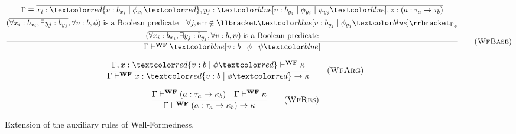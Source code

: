 \begin{figure}[H]
    \begin{equation}
        \frac{
            \begin{gathered}
                \Gamma \equiv \overline{x_i:\overa{v: b_{x_i} \;|\; \phi_{x_i}}, y_j:\under{v: b_{y_j} \;|\; \phi_{y_j} \;|\; \psi_{y_j}}, z:(a:\tau_a \rightarrow \tau_b)} \\
                (\overline{\forall x_i: b_{x_i}, \exists y_j: b_{y_j}}, \forall v: b, \phi) \; \text{is a Boolean predicate} \quad \forall j, \text{err} \notin \llbracket \under{v: b_{y_j} \;|\; \phi_{y_j}} \rrbracket_{\Gamma_{\phi}} \\
                (\overline{\forall x_i: b_{x_i}, \exists y_j: b_{y_j}}, \forall v: b, \psi) \; \text{is a Boolean predicate}
            \end{gathered}
        }{
            \Gamma \vdash^{\textbf{WF}} \under{v: b \;|\; \phi \;|\; \psi}
        }
        \tag{\textsc{WfBase}}
        \label{eq:wfbase}
    \end{equation}
    \begin{multicols}{2}
        \raggedcolumns
        \begin{equation}
            \frac{
                \Gamma, x:\overa{v: b \;|\; \phi} \vdash^{\textbf{WF}} \kappa
            }{
                \Gamma \vdash^{\textbf{WF}} x:\overa{v: b \;|\; \phi} \rightarrow \kappa
            }
            \tag{\textsc{WfArg}}
            \label{eq:wfarg}
        \end{equation}
    
        \columnbreak
    
        \begin{equation}
            \frac{
                \Gamma \vdash^{\textbf{WF}} (a: \tau_a \rightarrow \kappa_b) \quad \Gamma \vdash^{\textbf{WF}} \kappa
            }{
                \Gamma \vdash^{\textbf{WF}} (a: \tau_a \rightarrow \kappa_b) \rightarrow \kappa
            }
            \tag{\textsc{WfRes}}
            \label{eq:wfres}
        \end{equation}
    \end{multicols}
    \caption{Extension of the auxiliary rules of Well-Formedness.}
    \label{fig:well-form}
\end{figure}

